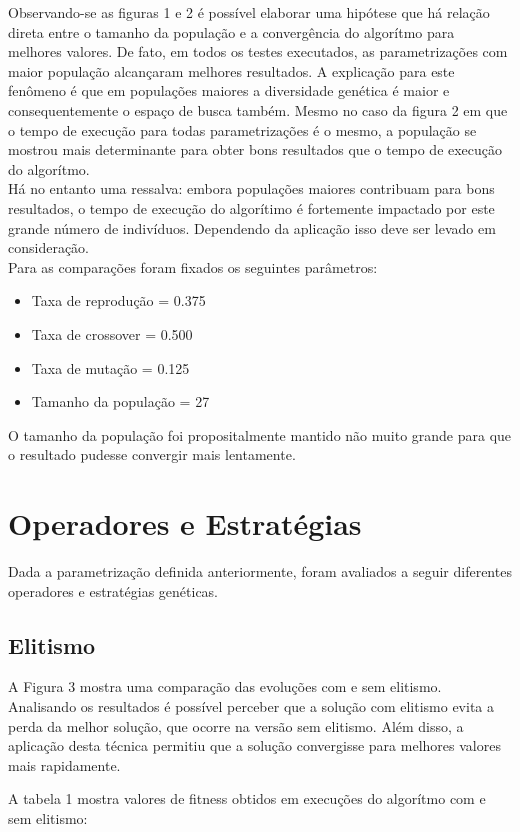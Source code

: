 \documentclass[conference]{IEEEtran}
\begin{document}
Observando-se as figuras 1 e 2 é possível elaborar uma hipótese que há relação direta
entre o tamanho da população e a convergência do algorítmo para melhores valores.
De fato, em todos os testes executados, as parametrizações com maior população
alcançaram melhores resultados. A explicação para este fenômeno é que em
populações maiores a diversidade genética é maior e consequentemente o espaço de
busca também. Mesmo no caso da figura 2 em que o tempo de execução para todas
parametrizações é o mesmo, a população se mostrou mais determinante para obter
bons resultados que o tempo de execução do algorítmo.\\
Há no entanto uma ressalva: embora populações maiores contribuam para bons 
resultados, o tempo de execução do algorítimo é fortemente impactado por este 
grande número de indivíduos. Dependendo da aplicação isso deve ser levado em 
consideração.\\

Para as comparações foram fixados os seguintes parâmetros:
\begin{itemize}
\item Taxa de reprodução = 0.375
\item Taxa de crossover = 0.500
\item Taxa de mutação = 0.125
\item Tamanho da população = 27
\end{itemize}

O tamanho da população foi propositalmente mantido não muito grande para que o 
resultado pudesse convergir mais lentamente.

\section{Operadores e Estratégias}
Dada a parametrização definida anteriormente, foram avaliados a seguir 
diferentes operadores e estratégias genéticas.

\subsection{Elitismo}
A Figura 3 mostra uma comparação das evoluções com e sem elitismo. Analisando os
resultados é possível perceber que a solução com elitismo evita a perda da melhor 
solução, que ocorre na versão sem elitismo. Além disso, a aplicação desta técnica
permitiu que a solução convergisse para melhores valores mais rapidamente.

A tabela 1 mostra valores de fitness obtidos em execuções do algorítmo
com e sem elitismo:\\
\end{document}
